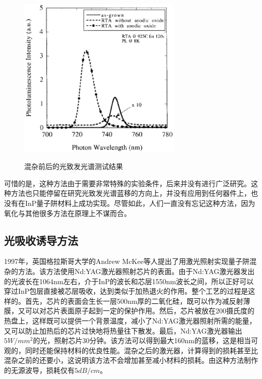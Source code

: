 \documentclass[oneside]{ZJUthesis}
\begin{document}
\begin{figure}[!h]
  \centering
  \includegraphics[width=0.7\textwidth]{./Pictures/oxide_pl.eps}\\
  \caption{混杂前后的光致发光谱测试结果}
  \label{fig_oxide_pl}
\end{figure}

可惜的是，这种方法由于需要非常特殊的实验条件，后来并没有进行广泛研究。这种方法也只能停留在研究光致发光谱蓝移的方向上，并没有应用到任何器件上，也没有在InP量子阱材料上成功实现。尽管如此，人们一直没有忘记这种方法，因为氧化与其他很多方法在原理上不谋而合\cite{dubowski1999enhanced}\cite{liu2012xps}\cite{liu2013chemical}。

\subsection{光吸收诱导方法}

1997年，英国格拉斯哥大学的Andrew McKee等人提出了用激光照射实现量子阱混杂的方法\cite{mckee1997monolithic-PAID}。该方法使用Nd:YAG激光器照射芯片的表面。由于Nd:YAG激光器发出的光波长在1064nm左右，介于InP的波长和芯层1550nm波长之间，所以正好可以穿过InP包层直接被芯层吸收，达到类似于加热退火的作用。整个工艺的过程是这样的。首先，芯片的表面会生长一层500nm厚的二氧化硅，既可以作为减反射薄膜，又可以对芯片表面原子起到一定的保护作用。然后，芯片被放在200摄氏度的热盘上，这样既可以提供一个背景温度，减小了Nd:YAG激光器照射所需的能量，又可以防止加热后的芯片过快地将热量往下散发。最后，Nd:YAG激光器输出$5W/mm^2$的光，照射芯片30分钟。该方法可以得到最大160nm的蓝移，这是相当可观的，同时还能保持材料的优良性能。混杂之后的激光器，计算得到的损耗甚至比混杂之前的还要小，这说明该方法不会增加甚至减小材料的损耗。由这种方法制作的无源波导，损耗仅有$5dB/cm$。
\end{document}
